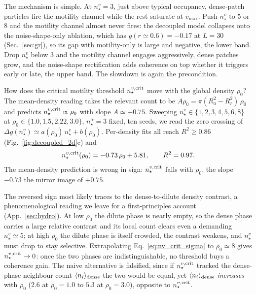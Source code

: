 \documentclass[11pt,a4paper]{article}
\begin{document}
The mechanism is simple. At $n_\star^v = 3$, just above typical
occupancy, dense-patch particles fire the motility channel while
the rest saturate at $v_{\max}$. Push $n_\star^v$ to $5$ or $8$
and the motility channel almost never fires: the decoupled model
collapses onto the noise-shape-only ablation, which has
$g(r\!\simeq\!0.6) = -0.17$ at $L = 30$ (Sec.~\ref{sec:gr}), so
its gap with motility-only is large and negative, the lower
band. Drop $n_\star^v$ below $3$ and the motility channel
engages aggressively, dense patches grow, and the noise-shape
rectification adds coherence on top whether it triggers early or
late, the upper band. The slowdown is again the precondition.

\label{sec:decoupled-sigma}
How does the critical motility threshold
$n_\star^{v,{\rm crit}}$ move with the global density $\rho_0$?
The mean-density reading takes the relevant count to be $A\rho_0
= \pi(R_a^2 - R_r^2)\,\rho_0$ and predicts $n_\star^{v,{\rm
crit}} \propto \rho_0$ with slope $A \simeq +0.75$. Sweeping
$n_\star^v \in \{1, 2, 3, 4, 5, 6, 8\}$ at $\rho_0
\in \{1.0, 1.5, 2.22, 3.0\}$, $n_\star^\alpha = 3$ fixed, ten
seeds, we read the zero crossing of $\Delta g(n_\star^v)
\simeq a(\rho_0)\, n_\star^v + b(\rho_0)$. Per-density fits all
reach $R^2 \ge 0.86$ (Fig.~\ref{fig:decoupled_2d}c) and
\begin{equation}
n_\star^{v,{\rm crit}}(\rho_0)
   = -0.73\,\rho_0 + 5.81,
\qquad R^2 = 0.97.
\label{eq:nv_crit_sigma}
\end{equation}
The mean-density prediction is wrong in sign:
$n_\star^{v,{\rm crit}}$ falls with $\rho_0$, the slope
$-0.73$ the mirror image of $+0.75$.

The reversed sign most likely traces to the dense-to-dilute
density contrast, a phenomenological reading we leave for a
first-principles account (App.~\ref{sec:hydro}). At low $\rho_0$
the dilute phase is nearly empty, so the dense phase carries a
large relative contrast and its local count clears even a
demanding $n_\star^v \simeq 5$; at high $\rho_0$ the dilute
phase is itself crowded, the contrast weakens, and $n_\star^v$
must drop to stay selective. Extrapolating
Eq.~\eqref{eq:nv_crit_sigma} to $\rho_0 \simeq 8$ gives
$n_\star^{v,{\rm crit}} \to 0$: once the two phases are
indistinguishable, no threshold buys a coherence gain. The
naive alternative is falsified, since if $n_\star^{v,{\rm crit}}$
tracked the dense-phase neighbour count $\langle n_i\rangle_{\rm
dense}$ the two would be equal, yet $\langle n_i\rangle_{\rm
dense}$ \emph{increases} with $\rho_0$ ($2.6$ at $\rho_0 = 1.0$
to $5.3$ at $\rho_0 = 3.0$), opposite to $n_\star^{v,{\rm
crit}}$.
\end{document}
